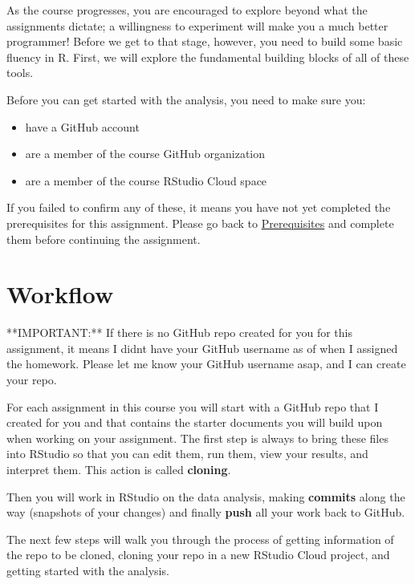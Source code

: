 \documentclass[
]{article}
\newenvironment{Shaded}{\begin{snugshade}}{\end{snugshade}}
\newcommand{\NormalTok}[1]{#1}
\providecommand{\tightlist}{%
  \setlength{\itemsep}{0pt}\setlength{\parskip}{0pt}}
\begin{document}
As the course progresses, you are encouraged to explore beyond what the
assignments dictate; a willingness to experiment will make you a much
better programmer! Before we get to that stage, however, you need to
build some basic fluency in R. First, we will explore the fundamental
building blocks of all of these tools.

Before you can get started with the analysis, you need to make sure you:

\begin{itemize}
\tightlist
\item
  have a GitHub account
\item
  are a member of the course GitHub organization
\item
  are a member of the course RStudio Cloud space
\end{itemize}

If you failed to confirm any of these, it means you have not yet
completed the prerequisites for this assignment. Please go back to
\hyperref[prerequisites]{Prerequisites} and complete them before
continuing the assignment.

\section{Workflow}\label{workflow}

\begin{Shaded}
\begin{Highlighting}[]
\NormalTok{**IMPORTANT:** If there is no GitHub repo created for you for this assignment, it means I didn\textquotesingle{}t have your GitHub username as of when I assigned the homework. Please let me know your GitHub username asap, and I can create your repo.}
\end{Highlighting}
\end{Shaded}

For each assignment in this course you will start with a GitHub repo
that I created for you and that contains the starter documents you will
build upon when working on your assignment. The first step is always to
bring these files into RStudio so that you can edit them, run them, view
your results, and interpret them. This action is called
\textbf{cloning}.

Then you will work in RStudio on the data analysis, making
\textbf{commits} along the way (snapshots of your changes) and finally
\textbf{push} all your work back to GitHub.

The next few steps will walk you through the process of getting
information of the repo to be cloned, cloning your repo in a new RStudio
Cloud project, and getting started with the analysis.
\end{document}
